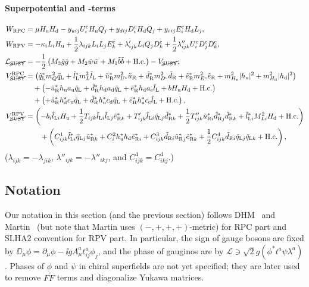 \documentclass[CheatSheet]{subfiles}
\begin{document}
\paragraph{Superpotential and -terms}
\begin{align}
 W\w{RPC} &= \mu\Hu\Hd
           - \yu[ij] U^\cc_i\Hu Q_j
           + \yd[ij] D^\cc_i\Hd Q_j
           + \ye[ij] E^\cc_i\Hd L_j,\\
 W\w{RPV} &= -\kappa_i L_i\Hu 
           + \frac12 \lambda  _{ijk} L_i L_j E^\cc_k
           +         \lambda' _{ijk} L_i Q_j D^\cc_k
           + \frac12 \lambda''_{ijk} U^\cc_i D^\cc_j D^\cc_k,
\\
\mathcal L_{\text{\cancel{SUSY}}}&=
- \frac12\left(M_3\tig\tig+M_2\tiw\tiw+M_1\tib\tib+\text{H.c.}\right)
-V_{\text{\cancel{SUSY}}};\\
V^{\mathrm{RPC}}_{\text{\cancel{SUSY}}}&=
\left(\tqL^*m_Q^2\tqL+\tlL^*m_L^2\tlL+\tuR^* m_{U^\cc}^2\tuR + \tdR^* m_{D^\cc}^2\tdR + \teR^* m_{E^\cc}^2\teR
       +m^2_{\Hu}|\hu|^2 + m^2_{\Hd}|\hd|^2\right)
\notag\\&\quad
       +\left(-\tuR^*\hu {a\w u}\tqL + \tdR^* \hd {a\w d} \tqL+ \teR^* \hd {a\w e} \tlL + b\Hu\Hd+\text{H.c.}\right)
\notag\\&\quad
       +\left(+\tuR^*\hd^*{c\w u}\tqL+\tdR^* \hu^*{c\w d}\tqL+\teR^*\hu^*{c\w e}\tlL+\text{H.c.}\right),
\\
V^{\mathrm{RPV}}_{\text{\cancel{SUSY}}}&=
    \left(-b_i\tlL[i]\Hu +\frac12T_{ijk}\tlL[i]\tlL[j]\teR[k]^*+T'_{ijk}\tlL[i]\tqL[j]\tdR[k]^*
             +\frac12T''_{ijk}\tuR[i]^*\tdR[j]^*\tdR[k]^*
    +\tlL[i]^*M^2_{Li}\Hd+\text{H.c.}\right)
\notag\\&\qquad
   + \left(C^1_{ijk}\tlL[i]^*\tqL[j]\tuR[k]^* + C^2_i\hu^*\hd\teR[i]^* + C^3_{ijk}\tdR[i]\tuR[j]^*\teR[k]^*+\frac12C^4_{ijk}\tdR[i]\tqL[j]\tqL[k]+\text{H.c.}\right),
\end{align}
($\lambda_{ijk}=-\lambda_{jik}$, $\lambda''_{ijk}=-\lambda''_{ikj}$, and 
$C^4_{ijk}=C^4_{ikj}$.)



\clearpage

\detailstyle



\subsection{Notation}
Our notation in this section (and the previous section)  follows DHM~\cite[PhysRept]{0812.1594} and Martin~\cite[v7]{hep-ph9709356} (but note that Martin uses $(-,+,+,+)$-metric) for RPC part and SLHA2 convention for RPV part.
In particular, the sign of gauge bosons are fixed by $\DD_\mu\phi = \partial_\mu\phi - \ii g A_\mu^a t^a_{ij}\phi_j$, and the phase of gauginos are by $\mathcal L\ni \sqrt2 g (\phi^*t^a\psi\lambda^a)$.
Phases of $\phi$ and $\psi$ in chiral superfields are not yet specified; they are later used to remove $F\tilde F$ terms and diagonalize Yukawa matrices.
\end{document}
